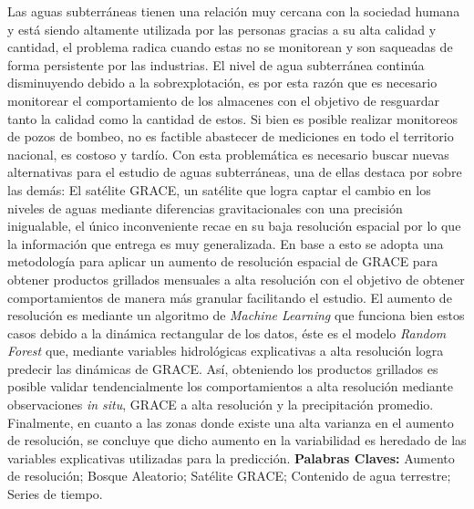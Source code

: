 Las aguas subterráneas tienen una relación muy cercana con la sociedad humana y está siendo altamente utilizada por las personas gracias a su
alta calidad y cantidad, el problema radica cuando estas no se monitorean y son saqueadas de forma persistente por las industrias. El nivel de agua
subterránea continúa disminuyendo debido a la sobrexplotación, es por esta razón que es necesario monitorear el comportamiento de 
los almacenes con el objetivo de resguardar tanto la calidad como la cantidad de estos. Si bien es posible realizar monitoreos de pozos de bombeo, no es 
factible abastecer de mediciones en todo el territorio nacional, es costoso y tardío. Con esta problemática es necesario buscar nuevas alternativas para el estudio de 
aguas subterráneas, una de ellas destaca por sobre las demás: El satélite GRACE, un satélite que logra captar el cambio en los niveles de aguas mediante diferencias gravitacionales con una precisión inigualable,
el único inconveniente recae en su baja resolución espacial por lo que la información que entrega es muy
generalizada. En base a esto se adopta una metodología para aplicar un aumento de resolución espacial de GRACE para obtener productos grillados mensuales a alta resolución con el 
objetivo de obtener comportamientos de manera más granular facilitando el estudio. El aumento de resolución es mediante un algoritmo de \textit{Machine Learning} que funciona bien estos casos 
debido a la dinámica rectangular de los datos, éste es el modelo \textit{Random Forest} que, mediante variables hidrológicas explicativas a alta resolución logra predecir 
las dinámicas de GRACE. Así, obteniendo los productos grillados es posible validar tendencialmente
los comportamientos a alta resolución mediante observaciones \textit{in situ}, GRACE a alta resolución y la precipitación promedio.
Finalmente, en cuanto a las zonas donde existe una alta varianza en el aumento de resolución, se concluye que dicho aumento en la variabilidad es heredado de las variables explicativas utilizadas para la predicción.
\vskip 0.2in
\noindent
{\bf Palabras Claves:} Aumento de resolución; Bosque Aleatorio; Satélite GRACE; Contenido de agua terrestre; Series de tiempo.